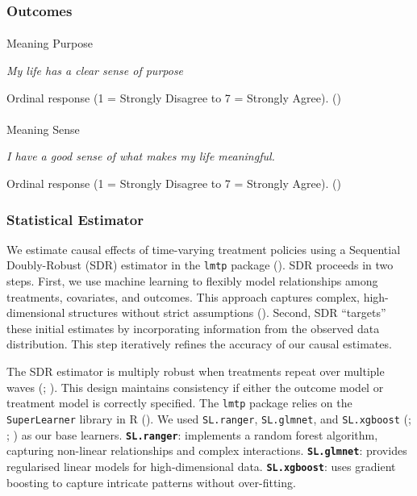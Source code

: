 \documentclass[
  single column]{article}
\makeatletter
\let\oldparagraph\paragraph
\renewcommand{\paragraph}{
    \@ifstar
      \xxxParagraphStar
      \xxxParagraphNoStar
  }
\newcommand{\xxxParagraphStar}[1]{\oldparagraph*{#1}\mbox{}}
\newcommand{\xxxParagraphNoStar}[1]{\oldparagraph{#1}\mbox{}}
\makeatother
\begin{document}
\subsubsection{Outcomes}\label{outcomes}

\paragraph{Meaning Purpose}\label{meaning-purpose}

\emph{My life has a clear sense of purpose}

Ordinal response (1 = Strongly Disagree to 7 = Strongly Agree).
()

\paragraph{Meaning Sense}\label{meaning-sense}

\emph{I have a good sense of what makes my life meaningful.}

Ordinal response (1 = Strongly Disagree to 7 = Strongly Agree).
()

\subsubsection{Statistical Estimator}\label{statistical-estimator}

We estimate causal effects of time-varying treatment policies using a
Sequential Doubly-Robust (SDR) estimator in the \texttt{lmtp} package
(). SDR proceeds in
two steps. First, we use machine learning to flexibly model
relationships among treatments, covariates, and outcomes. This approach
captures complex, high-dimensional structures without strict assumptions
(). Second, SDR
``targets'' these initial estimates by incorporating information from
the observed data distribution. This step iteratively refines the
accuracy of our causal estimates.

The SDR estimator is multiply robust when treatments repeat over
multiple waves (;
). This design
maintains consistency if either the outcome model or treatment model is
correctly specified. The \texttt{lmtp} package relies on the
\texttt{SuperLearner} library in R
(). We used
\texttt{SL.ranger}, \texttt{SL.glmnet}, and \texttt{SL.xgboost}
(;
;
) as our base
learners. \textbf{\texttt{SL.ranger}}: implements a random forest
algorithm, capturing non-linear relationships and complex interactions.
\textbf{\texttt{SL.glmnet}}: provides regularised linear models for
high-dimensional data. \textbf{\texttt{SL.xgboost}}: uses gradient
boosting to capture intricate patterns without over-fitting.
\end{document}
